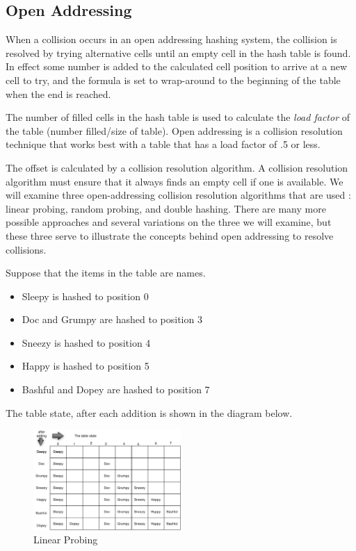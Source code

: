 \subsection{Open Addressing}

     When a collision occurs in an open addressing hashing system, the collision is resolved by trying alternative cells until an empty cell in the hash table is found. In effect some number is added to the calculated cell position to arrive at a new cell to try, and the formula is set to wrap-around to the beginning of the table when the end is reached.
   
     The number of filled cells in the hash table is used to calculate the \textit{load factor} of the table (number filled/size of table). Open addressing is a collision resolution technique that works best with a table that has a load factor of .5 or less.
   
     The offset is calculated by a collision resolution algorithm. A collision resolution algorithm must ensure that it always finds an empty cell if one is available. We will examine three open-addressing collision resolution algorithms that are used : linear probing, random probing, and double hashing.   There are many more possible approaches and several variations on the three we will examine, but these three serve to illustrate the concepts behind open addressing to resolve collisions.
   
Suppose that the items in the table are names.
\begin{itemize}
\item Sleepy is hashed to position 0
\item Doc and Grumpy are hashed to position 3
\item Sneezy is hashed to position 4
\item Happy is hashed to position 5
\item Bashful and Dopey are hashed to position 7
\end{itemize}



The table state, after each addition is shown in the diagram below.


\begin{figure}[H]
\centering
\includegraphics[width=0.5\textwidth]{pictures/Linear_Probing_0.png}
\caption{Linear Probing}
\label{fig:linearProb}
\end{figure}


